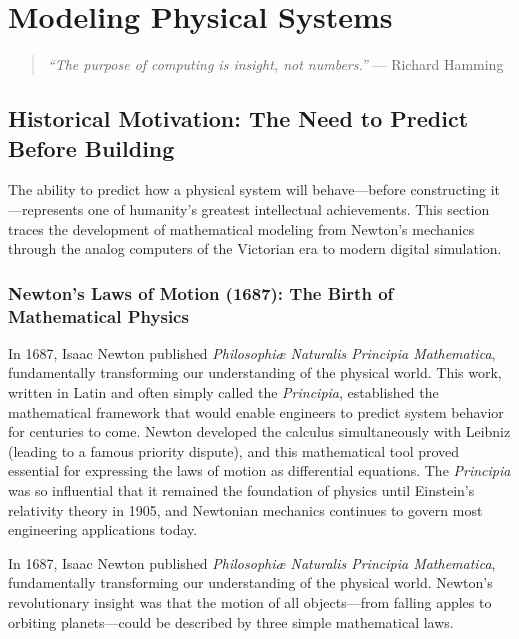
\chapter{Modeling Physical Systems}
\label{ch:modeling}

\begin{quote}
\textit{``The purpose of computing is insight, not numbers.''} --- Richard Hamming
\end{quote}

\section{Historical Motivation: The Need to Predict Before Building}

The ability to predict how a physical system will behave---before constructing it---represents one of humanity's greatest intellectual achievements. This section traces the development of mathematical modeling from Newton's mechanics through the analog computers of the Victorian era to modern digital simulation.

\subsection{Newton's Laws of Motion (1687): The Birth of Mathematical Physics}

\begin{historicalbox}
In 1687, Isaac Newton published \textit{Philosophi\ae{} Naturalis Principia Mathematica}, fundamentally transforming our understanding of the physical world. This work, written in Latin and often simply called the \textit{Principia}, established the mathematical framework that would enable engineers to predict system behavior for centuries to come. Newton developed the calculus simultaneously with Leibniz (leading to a famous priority dispute), and this mathematical tool proved essential for expressing the laws of motion as differential equations. The \textit{Principia} was so influential that it remained the foundation of physics until Einstein's relativity theory in 1905, and Newtonian mechanics continues to govern most engineering applications today.
\end{historicalbox}

In 1687, Isaac Newton published \textit{Philosophi\ae{} Naturalis Principia Mathematica}, fundamentally transforming our understanding of the physical world. Newton's revolutionary insight was that the motion of all objects---from falling apples to orbiting planets---could be described by three simple mathematical laws.

